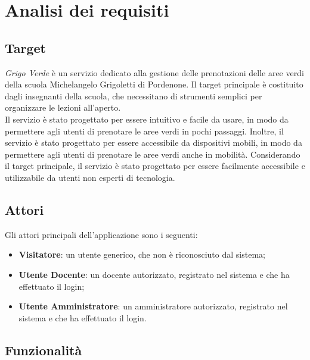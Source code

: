 \section{Analisi dei requisiti}

\subsection{Target}

\textit{Grigo Verde} è un servizio dedicato alla gestione delle prenotazioni
delle aree verdi della scuola Michelangelo Grigoletti di Pordenone. Il target
principale è costituito dagli insegnanti della scuola, che necessitano di
strumenti semplici per organizzare le lezioni all'aperto.\\
Il servizio è stato progettato per essere intuitivo e facile da usare, in modo
da permettere agli utenti di prenotare le aree verdi in pochi passaggi. Inoltre,
il servizio è stato progettato per essere accessibile da dispositivi mobili, in
modo da permettere agli utenti di prenotare le aree verdi anche in mobilità.
Considerando il target principale, il servizio è stato progettato per essere
facilmente accessibile e utilizzabile da utenti non esperti di tecnologia.

\subsection{Attori}

Gli attori principali dell'applicazione sono i seguenti:

\begin{itemize}
    \item \textbf{Visitatore}: un utente generico, che non è riconosciuto dal 
        sistema;

    \item \textbf{Utente Docente}: un docente autorizzato, registrato nel
        sistema e che ha effettuato il login;

    \item \textbf{Utente Amministratore}: un amministratore autorizzato,
        registrato nel sistema e che ha effettuato il login.
\end{itemize}

\subsection{Funzionalità}

